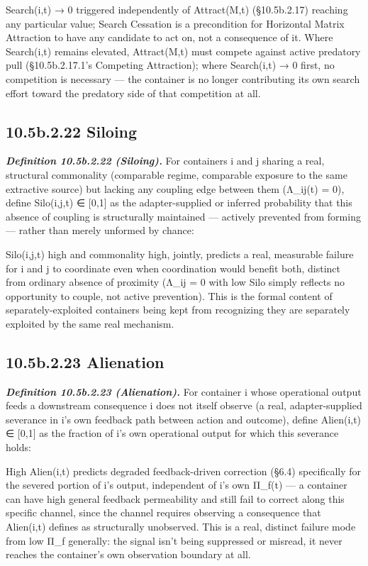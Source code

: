 \documentclass[
]{article}
\begin{document}
Search(i,t) → 0 triggered independently of Attract(M,t) (§10.5b.2.17)
reaching any particular value; Search Cessation is a precondition for
Horizontal Matrix Attraction to have any candidate to act on, not a
consequence of it. Where Search(i,t) remains elevated, Attract(M,t) must
compete against active predatory pull (§10.5b.2.17.1's Competing
Attraction); where Search(i,t) → 0 first, no competition is necessary
--- the container is no longer contributing its own search effort toward
the predatory side of that competition at all.

\hypertarget{b.2.22-siloing}{%
\subsection{10.5b.2.22 Siloing}\label{b.2.22-siloing}}

\emph{\textbf{Definition 10.5b.2.22 (Siloing).}} For containers i and j
sharing a real, structural commonality (comparable regime, comparable
exposure to the same extractive source) but lacking any coupling edge
between them (Λ\_ij(t) = 0), define Silo(i,j,t) ∈ {[}0,1{]} as the
adapter-supplied or inferred probability that this absence of coupling
is structurally maintained --- actively prevented from forming ---
rather than merely unformed by chance:

Silo(i,j,t) high and commonality high, jointly, predicts a real,
measurable failure for i and j to coordinate even when coordination
would benefit both, distinct from ordinary absence of proximity (Λ\_ij =
0 with low Silo simply reflects no opportunity to couple, not active
prevention). This is the formal content of separately-exploited
containers being kept from recognizing they are separately exploited by
the same real mechanism.

\hypertarget{b.2.23-alienation}{%
\subsection{10.5b.2.23 Alienation}\label{b.2.23-alienation}}

\emph{\textbf{Definition 10.5b.2.23 (Alienation).}} For container i
whose operational output feeds a downstream consequence i does not
itself observe (a real, adapter-supplied severance in i's own feedback
path between action and outcome), define Alien(i,t) ∈ {[}0,1{]} as the
fraction of i's own operational output for which this severance holds:

High Alien(i,t) predicts degraded feedback-driven correction (§6.4)
specifically for the severed portion of i's output, independent of i's
own Π\_f(t) --- a container can have high general feedback permeability
and still fail to correct along this specific channel, since the channel
requires observing a consequence that Alien(i,t) defines as structurally
unobserved. This is a real, distinct failure mode from low Π\_f
generally: the signal isn't being suppressed or misread, it never
reaches the container's own observation boundary at all.
\end{document}
